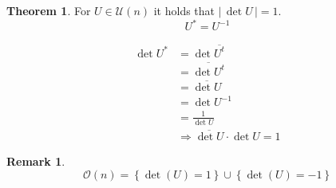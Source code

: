 \documentclass[a4paper,landscape,twocolumn]{article}
\newcommand\abs[1]{|\,#1\,|}
\newcommand\set[1]{\left\{#1\right\}}
\theoremstyle{definition}
\newtheorem{theorem}{Theorem}
\newtheorem{rem}{Remark}
\begin{document}
\begin{theorem}
  For $U \in \mathcal U(n)$ it holds that $\abs{\det{U}} = 1$.
  \[ U^* = U^{-1} \]

  \begin{align*}
    \det{U^*} & =\det{\overline{U^t}} \\
      &= \overline{\det{U^t}} \\
      &= \overline{\det{U}} \\
      &= \det{U^{-1}} \\
      &= \frac{1}{\det{U}} \\
      &\Rightarrow \overline{\det{U}} \cdot \det{U} = 1
  \end{align*}
\end{theorem}

\begin{rem}
  \[ \mathcal O(n) = \set{\det(U) = 1} \cup \set{\det(U) = -1} \]
\end{rem}
\end{document}
